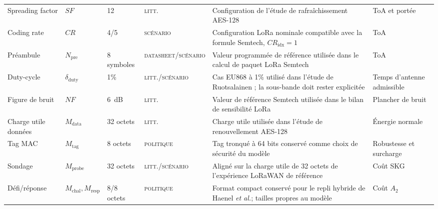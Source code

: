 \documentclass[conference,a4paper]{IEEEtran}
\newcommand{\statusData}{\textsc{datasheet}}
\newcommand{\statusLit}{\textsc{litt.}}
\newcommand{\statusScen}{\textsc{scénario}}
\newcommand{\statusPol}{\textsc{politique}}
\begin{document}
\begin{table}[H]
\begin{tabularx}{\textwidth}{@{}l l l l Y Y@{}}
Spreading factor & $SF$ & 12 & \statusLit{} & Configuration de l'étude de rafraîchissement AES-128 \cite[Sec.~V-C]{ruotsalainen2020} & ToA et portée \\
Coding rate & $CR$ & 4/5 & \statusScen{} & Configuration LoRa nominale compatible avec la formule Semtech, $CR_{\mathrm{idx}}=1$ \cite[Sec.~4.1.1.6]{sx1276ds} & ToA \\
Préambule & $N_{\mathrm{pre}}$ & 8 symboles & \statusData{}/\statusScen{} & Valeur programmée de référence utilisée dans le calcul de paquet LoRa Semtech \cite[Sec.~4.1.1.6]{sx1276ds} & ToA \\
Duty-cycle & $\delta_{\mathrm{duty}}$ & 1\% & \statusLit{}/\statusScen{} & Cas EU868 à 1\% utilisé dans l'étude de Ruotsalainen ; la sous-bande doit rester explicitée \cite[Sec.~V-C]{ruotsalainen2020} & Temps d'antenne admissible \\
Figure de bruit & $NF$ & \SI{6}{dB} & \statusLit{} & Valeur de référence Semtech utilisée dans le bilan de sensibilité LoRa \cite{sx1276ds} & Plancher de bruit \\
Charge utile données & $M_{\mathrm{data}}$ & 32 octets & \statusLit{} & Charge utile utilisée dans l'étude de renouvellement AES-128 \cite[Sec.~V-C]{ruotsalainen2020} & Énergie normale \\
Tag MAC & $M_{\mathrm{tag}}$ & 8 octets & \statusPol{} & Tag tronqué à 64 bits conservé comme choix de sécurité du modèle & Robustesse et surcharge \\
Sondage & $M_{\mathrm{probe}}$ & 32 octets & \statusLit{}/\statusScen{} & Aligné sur la charge utile de 32 octets de l'expérience LoRaWAN de référence \cite[Sec.~V-C]{ruotsalainen2020} & Coût SKG \\
Défi/réponse & $M_{\mathrm{chal}},M_{\mathrm{resp}}$ & 8/8 octets & \statusPol{} & Format compact conservé pour le repli hybride de Haenel \emph{et al.}; tailles propres au modèle \cite{haenel2021} & Coût $A_2$ \\
\bottomrule
\end{tabularx}
\end{table}
\end{document}
